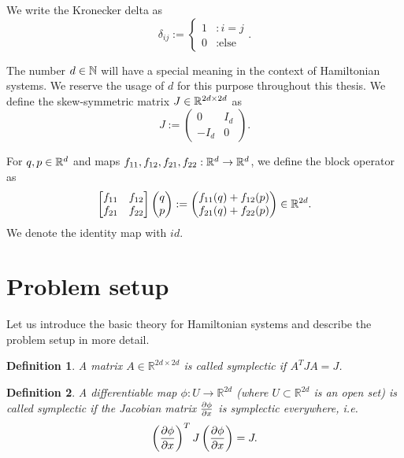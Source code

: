 \documentclass[twoside,a4paper]{article}
\newtheorem{definition}{Definition}
\begin{document}
We write the Kronecker delta as
\begin{equation*}
	\delta_{ij} := \begin{cases}
		1 &: i = j \\
		0 &: \text{else}
	\end{cases}
	.
\end{equation*}

The number $d \in \mathbb{N}$ will have a special meaning in the context of Hamiltonian systems.
We reserve the usage of $d$ for this purpose throughout this thesis. We define 
the skew-symmetric matrix $J \in \mathbb{R}^{2d \times 2d}$ as
\begin{equation*}
	J := \begin{pmatrix}
		0 & I_d \\
		-I_d & 0
	\end{pmatrix}
	.
\end{equation*}

For $q,p \in \mathbb{R}^{d}$ and maps $f_{11}, f_{12}, f_{21}, f_{22} : \mathbb{R}^d \to \mathbb{R}^d$,
we define the block operator as
\begin{equation*}
	\begin{bmatrix}
		f_{11} & f_{12} \\
		f_{21} & f_{22}
	\end{bmatrix}
	\begin{pmatrix} q \\ p \end{pmatrix}
	:= \begin{pmatrix}
		f_{11}(q) + f_{12}(p) \\
		f_{21}(q) + f_{22}(p)
	\end{pmatrix} \in \mathbb{R}^{2d}
	.
\end{equation*}
We denote the identity map with $id$.


%
%
\newpage
\section{Problem setup}\label{sec_problem_setup}
Let us introduce the basic theory for Hamiltonian systems and describe the problem
setup in more detail.

\begin{definition}
	A matrix $A \in \mathbb{R}^{2d \times 2d}$ is called symplectic if $A^TJA=J$.
\end{definition}

\begin{definition}
	A differentiable map $\phi : U \to \mathbb{R}^{2d}$ (where $U \subset \mathbb{R}^{2d}$ is an open set)
	is called symplectic if the Jacobian matrix $\frac{\partial \phi}{\partial x}$ is symplectic everywhere, i.e.
	\begin{equation*}
		\left( \frac{\partial \phi}{\partial x} \right)^T J \left( \frac{\partial \phi}{\partial x} \right) = J
		.
	\end{equation*}
\end{definition}
\end{document}
